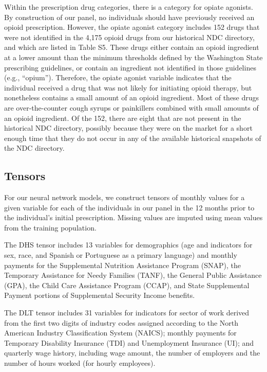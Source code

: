 \documentclass[9pt,twoside,lineno]{pnas-new}
\begin{document}
Within the prescription drug categories, there is a category for opiate agonists. By construction of our panel, no individuals should have previously received an opioid prescription. However, the opiate agonist category includes 152 drugs that were not identified in the 4,175 opioid drugs from our historical NDC directory, and which are listed in Table S5. These drugs either contain an opioid ingredient at a lower amount than the minimum thresholds defined by the Washington State prescribing guidelines, or contain an ingredient not identified in those guidelines (e.g., ``opium''). Therefore, the opiate agonist variable indicates that the individual received a drug that was not likely for initiating opioid therapy, but nonetheless contains a small amount of an opioid ingredient. Most of these drugs are over-the-counter cough syrups or painkillers combined with small amounts of an opioid ingredient. Of the 152, there are eight that are not present in the historical NDC directory, possibly because they were on the market for a short enough time that they do not occur in any of the available historical snapshots of the NDC directory.

\subsection{Tensors}

For our neural network models, we construct tensors of monthly values for a given variable for each of the individuals in our panel in the 12 months prior to the individual's initial prescription. Missing values are imputed using mean values from the training population.

The DHS tensor includes 13 variables for demographics (age and indicators for sex, race, and Spanish or Portuguese as a primary language) and monthly payments for the Supplemental Nutrition Assistance Program (SNAP), the Temporary Assistance for Needy Families (TANF), the General Public Assistance (GPA), the Child Care Assistance Program (CCAP), and State Supplemental Payment portions of Supplemental Security Income benefits.

The DLT tensor includes 31 variables for indicators for sector of work derived from the first two digits of industry codes assigned according to the North American Industry Classification System (NAICS); monthly payments for Temporary Disability Insurance (TDI) and Unemployment Insurance (UI); and quarterly wage history, including wage amount, the number of employers and the number of hours worked (for hourly employees).
\end{document}
